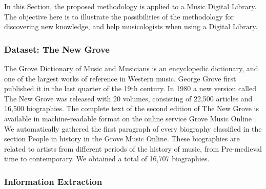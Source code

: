 In this Section, the proposed methodology is applied to a Music Digital Library. The objective here is to illustrate the possibilities of the methodology for discovering new knowledge, and help musicologists when using a Digital Library.



\subsubsection{Dataset: The New Grove}

The Grove Dictionary of Music and Musicians is an encyclopedic dictionary, and one of the largest works of reference in Western music. George Grove first published it in the last quarter of the 19th century. In 1980 a new version called The New Grove  was released with 20 volumes, consisting of 22,500 articles and 16,500 biographies. The complete text of the second edition of The New Grove is available in machine-readable format on the online service Grove Music Online .
We automatically gathered the first paragraph of every biography classified in the section People in history in the Grove Music Online. These biographies are related to artists from different periods of the history of music, from Pre-medieval time to contemporary. We obtained a total of 16,707 biographies.

\subsubsection{Information Extraction}

